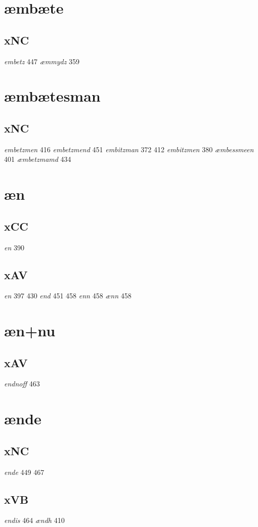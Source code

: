 \documentclass[a4paper,twocolumn]{article}
\begin{document}
\section{æmbæte}
\label{sec:org95f9224}
\subsection{xNC}
\label{sec:org34c5f95}
\emph{embetz} 447 \emph{æmmydz} 359 
\section{æmbætesman}
\label{sec:org7c397ba}
\subsection{xNC}
\label{sec:org2a8e301}
\emph{embetzmen} 416 \emph{embetzmend} 451 \emph{embitzman} 372 412 \emph{embitzmen} 380 \emph{æmbessmeen} 401 \emph{æmbetzmamd} 434 
\section{æn}
\label{sec:orgfd9b113}
\subsection{xCC}
\label{sec:orgb3d5531}
\emph{en} 390 
\subsection{xAV}
\label{sec:org7489616}
\emph{en} 397 430 \emph{end} 451 458 \emph{enn} 458 \emph{ænn} 458 
\section{æn+nu}
\label{sec:org0035187}
\subsection{xAV}
\label{sec:org1fabb8a}
\emph{endnoff} 463 
\section{ænde}
\label{sec:orga5ceac1}
\subsection{xNC}
\label{sec:orgb039ded}
\emph{ende} 449 467 
\subsection{xVB}
\label{sec:org5c431d2}
\emph{endis} 464 \emph{ændh} 410 
\end{document}
